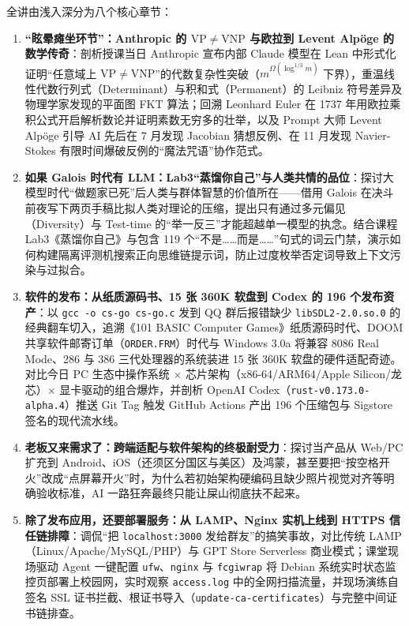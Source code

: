 \documentclass[a4paper]{article}
\begin{document}
全讲由浅入深分为八个核心章节：
\begin{enumerate}
    \item \textbf{“眩晕瘫坐环节”：Anthropic 的 $\mathrm{VP} \neq \mathrm{VNP}$ 与欧拉到 Levent Alpöge 的数学传奇}：剖析授课当日 Anthropic 宣布内部 Claude 模型在 Lean 中形式化证明“任意域上 $\mathrm{VP} \neq \mathrm{VNP}$”的代数复杂性突破（$m^{\Omega(\log^{1/3} m)}$ 下界），重温线性代数行列式（Determinant）与积和式（Permanent）的 Leibniz 符号差异及物理学家发现的平面图 FKT 算法；回溯 Leonhard Euler 在 1737 年用欧拉乘积公式开启解析数论并证明素数无穷多的壮举，以及 Prompt 大师 Levent Alpöge 引导 AI 先后在 7 月发现 Jacobian 猜想反例、在 11 月发现 Navier-Stokes 有限时间爆破反例的“魔法咒语”协作范式。
    \item \textbf{如果 Galois 时代有 LLM：Lab3“蒸馏你自己”与人类共情的品位}：探讨大模型时代“做题家已死”后人类与群体智慧的价值所在——借用 Galois 在决斗前夜写下两页手稿比拟人类对理论的压缩，提出只有通过多元偏见（Diversity）与 Test-time 的“举一反三”才能超越单一模型的执念。结合课程 Lab3《蒸馏你自己》与包含 119 个“不是……而是……”句式的词云门禁，演示如何构建隔离评测机搜索正向思维链提示词，防止过度枚举否定词导致上下文污染与过拟合。
    \item \textbf{软件的发布：从纸质源码书、15 张 360K 软盘到 Codex 的 196 个发布资产}：以 \texttt{gcc -o cs-go cs-go.c} 发到 QQ 群后报错缺少 \texttt{libSDL2-2.0.so.0} 的经典翻车切入，追溯《101 BASIC Computer Games》纸质源码时代、DOOM 共享软件邮寄订单（\texttt{ORDER.FRM}）时代与 Windows 3.0a 将兼容 8086 Real Mode、286 与 386 三代处理器的系统装进 15 张 360K 软盘的硬件适配奇迹。对比今日 PC 生态中操作系统 $\times$ 芯片架构（x86-64/ARM64/Apple Silicon/龙芯）$\times$ 显卡驱动的组合爆炸，并剖析 OpenAI Codex（\texttt{rust-v0.173.0-alpha.4}）推送 Git Tag 触发 GitHub Actions 产出 196 个压缩包与 Sigstore 签名的现代流水线。
    \item \textbf{老板又来需求了：跨端适配与软件架构的终极耐受力}：探讨当产品从 Web/PC 扩充到 Android、iOS（还须区分国区与美区）及鸿蒙，甚至要把“按空格开火”改成“点屏幕开火”时，为什么若初始架构硬编码且缺少照片视觉对齐等明确验收标准，AI 一路狂奔最终只能让屎山彻底扶不起来。
    \item \textbf{除了发布应用，还要部署服务：从 LAMP、Nginx 实机上线到 HTTPS 信任链排障}：调侃“把 \texttt{localhost:3000} 发给群友”的搞笑事故，对比传统 LAMP（Linux/Apache/MySQL/PHP）与 GPT Store Serverless 商业模式；课堂现场驱动 Agent 一键配置 \texttt{ufw}、\texttt{nginx} 与 \texttt{fcgiwrap} 将 Debian 系统实时状态监控页部署上校园网，实时观察 \texttt{access.log} 中的全网扫描流量，并现场演练自签名 SSL 证书拦截、根证书导入（\texttt{update-ca-certificates}）与完整中间证书链排查。

\end{enumerate}
\end{document}
